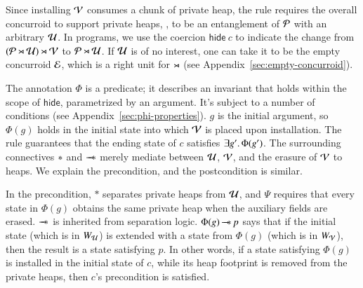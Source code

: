 %
%
Since installing $\mathcal{V}$ consumes a chunk of private heap, the rule
requires the overall concurroid to support private heaps, \ie, to be
an entanglement of $\mathcal{P}$ with an arbitrary $\mathcal{U}$. In programs,
we use the coercion $\mathsf{hide}\ c$ to indicate the change from
$(\mathcal{P} \rtimes {\mathcal{U}}) \rtimes {\mathcal{V}}$ to $\mathcal{P}
\rtimes \mathcal{U}$. If $\mathcal{U}$ is of no interest, one can take it to be
the empty concurroid $\mathcal{E}$, which is a right unit for $\rtimes$
(see Appendix~\ref{sec:empty-concurroid}).

The annotation $\Phi$ is a predicate; it describes an invariant that
holds within the scope of $\mathsf{hide}$, parametrized by an
argument. It's subject to a number of conditions (see
Appendix~\ref{sec:phi-properties}). $g$ is the initial argument, so
$\Phi(g)$ holds in the initial state into which $\mathcal{V}$ is placed upon
installation. The rule guarantees that the ending state of $c$
satisfies $\exists g'\mathord{.}\, \Phi(g')$. The surrounding connectives
$\ast$ and $\mathop{-\!\!\!\!-\!\!\!\ast}$ merely mediate between $\mathcal{U}$, $\mathcal{V}$, and the
erasure of $\mathcal{V}$ to heaps. We explain the precondition, and the
postcondition is similar.

In the precondition, $*$ separates private heaps from $\mathcal{U}$, and
$\Psi$ requires that every state in $\Phi(g)$ obtains the same private
heap when the auxiliary fields are erased. $\mathop{-\!\!\!\!-\!\!\!\ast}$ is inherited from
separation logic. $\Phi(g) \mathop{-\!\!\!\!-\!\!\!\ast} p$ says that if the initial state
(which is in $W_{\mathcal{U}}$) is extended with a state from $\Phi(g)$
(which is in $W_{\mathcal{V}}$), then the result is a state satisfying
$p$. In other words, if a state satisfying $\Phi(g)$ is installed in
the initial state of $c$, while its heap footprint is removed from the
private heaps, then $c$'s precondition is satisfied.

